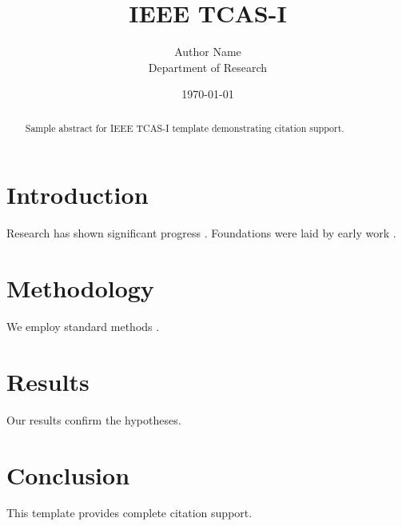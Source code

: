 ﻿\documentclass{IEEEtran}
\title{IEEE TCAS-I}
\author{Author Name \\ \small Department of Research}
\date{\today}
\begin{document}
\maketitle

\begin{abstract}
Sample abstract for IEEE TCAS-I template demonstrating citation support.
\end{abstract}

\section{Introduction}
Research has shown significant progress \citep{einstein1905}. Foundations were laid by early work \citep{turing1950}.

\section{Methodology}
We employ standard methods \citep{knuth1984}.

\section{Results}
Our results confirm the hypotheses.

\section{Conclusion}
This template provides complete citation support.



\end{document}
